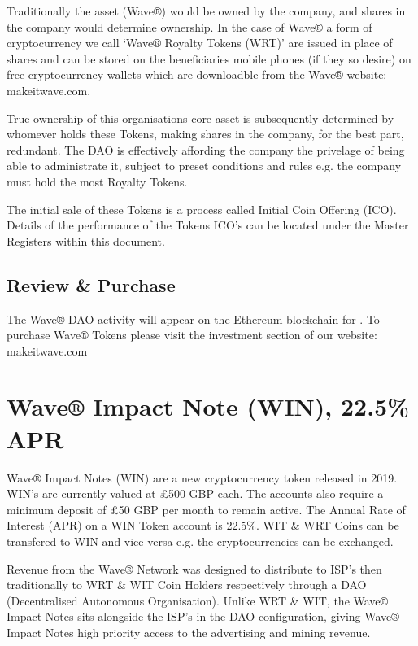 \documentclass[letterpaper,10pt,openany,oneside,english]{sphinxmanual}
\begin{document}
Traditionally the asset (Wave®) would be owned by the company, and shares in the company would determine ownership.
In the case of Wave® a form of cryptocurrency we call ‘Wave® Royalty Tokens (WRT)’ are issued in place of shares and can be stored on the beneficiaries mobile phones (if they so desire) on free cryptocurrency wallets which are downloadble from the Wave®  website: makeitwave.com.

True ownership of this organisations core asset is subsequently determined by whomever holds these Tokens, making shares in the company, for the best part, redundant.
The DAO is effectively affording the company the privelage of being able to administrate it, subject to preset conditions and rules e.g. the company must hold the most Royalty Tokens.

The initial sale of these Tokens is a process called Initial Coin Offering (ICO).
Details of the performance of the Tokens ICO’s can be located under the Master Registers within this document.


\section{Review \& Purchase}
\label{\detokenize{introduction:review-purchase}}
The Wave® DAO activity will appear on the Ethereum blockchain for .
To purchase Wave® Tokens please visit the investment section of our website: makeitwave.com


\chapter{Wave® Impact Note (WIN), 22.5\% APR}
\label{\detokenize{win-summary:wave-impact-note-win-22-5-apr}}\label{\detokenize{win-summary::doc}}
Wave® Impact Notes (WIN) are a new cryptocurrency token released in 2019.
WIN’s are currently valued at £500 GBP each.
The accounts also require a minimum deposit of £50 GBP per month to remain active.
The Annual Rate of Interest (APR) on a WIN Token account is 22.5\%.
WIT \& WRT Coins can be transfered to WIN and vice versa e.g. the cryptocurrencies can be exchanged.

Revenue from the Wave® Network was designed to distribute to ISP’s then traditionally to WRT \& WIT Coin Holders respectively through a DAO (Decentralised Autonomous Organisation).
Unlike WRT \& WIT, the Wave® Impact Notes sits alongside the ISP’s in the DAO configuration, giving Wave® Impact Notes high priority access to the advertising and mining revenue.
\end{document}
